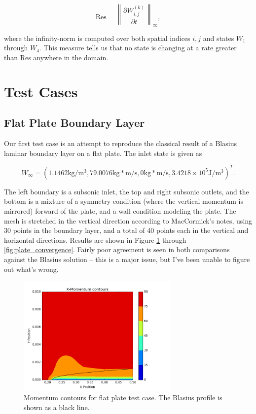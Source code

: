 \documentclass{article}
\begin{document}
\begin{equation}
\text{Res} = \left\|\frac{\partial W^{(k)}_{i,j}}{\partial t}\right\|_\infty,
\end{equation}

where the infinity-norm is computed over both spatial indices $i,j$ and states $W_1$ through $W_4$. This measure tells us that no state is changing at a rate greater than Res anywhere in the domain.

\newpage
\section{Test Cases}
\subsection{Flat Plate Boundary Layer}
Our first test case is an attempt to reproduce the classical result of a Blasius laminar boundary layer on a flat plate. The inlet state is given as

\begin{equation*}
W_{\infty} = (1.1462 \text{kg}/\text{m}^3,79.0076\text{kg}*\text{m}/\text{s},0\text{kg}*\text{m}/\text{s},3.4218\times10^5\text{J}/\text{m}^3)^T.
\end{equation*}

The left boundary is a subsonic inlet, the top and right subsonic outlets, and the bottom is a mixture of a symmetry condition (where the vertical momentum is mirrored) forward of the plate, and a wall condition modeling the plate. The mesh is stretched in the vertical direction according to MacCormick's notes, using 30 points in the boundary layer, and a total of 40 points each in the vertical and horizontal directions. Results are shown in Figure \ref{fig:plate_contour} through \ref{fig:plate_convergence}. Fairly poor agreement is seen in both comparisons against the Blasius solution -- this is a major issue, but I've been unable to figure out what's wrong.

\begin{figure}[!ht]
\centering
\includegraphics[width=0.7\textwidth]{images/plate_contour.png}
\caption{Momentum contours for flat plate test case. The Blasius profile is shown as a black line.}
\label{fig:plate_contour}
\end{figure}
\end{document}
